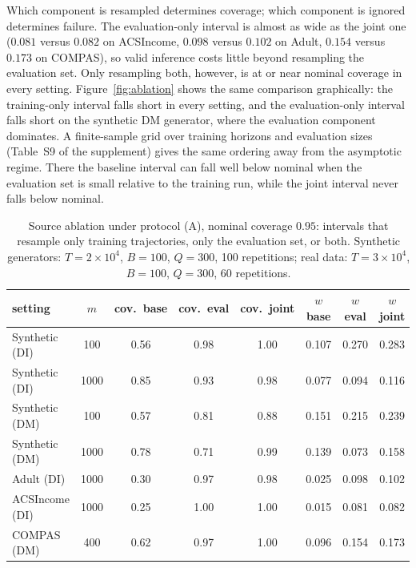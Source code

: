 \documentclass[pdflatex,sn-basic]{sn-jnl}
\begin{document}
Which component is resampled determines coverage; which component is ignored determines failure.  The
evaluation-only interval is almost as wide as the joint one ($0.081$ versus $0.082$ on ACSIncome,
$0.098$ versus $0.102$ on Adult, $0.154$ versus $0.173$ on COMPAS), so valid inference costs little
beyond resampling the evaluation set.  Only resampling both, however, is at or near nominal coverage in
every setting.  Figure~\ref{fig:ablation} shows the same comparison graphically: the training-only interval falls short in every setting, and the evaluation-only interval falls short on the synthetic DM generator, where the evaluation component dominates.  A finite-sample grid over training
horizons and evaluation sizes (Table~S9 of the supplement) gives the same ordering away from the
asymptotic regime.  There the baseline interval can fall well below nominal when the evaluation set is
small relative to the training run, while the joint interval never falls below nominal.

\begin{table}[t]
\centering
\small
\setlength{\tabcolsep}{3pt}
\caption{Source ablation under protocol (A), nominal coverage $0.95$: intervals that resample only
training trajectories, only the evaluation set, or both.  Synthetic generators: $T=2\times10^4$, $B=100$, $Q=300$, 100 repetitions; real data: $T=3\times10^4$, $B=100$, $Q=300$, 60 repetitions.}
\label{tab:ablation}
\begin{tabular}{lccccccc}
\toprule
setting & $m$ & cov.\ base & cov.\ eval & cov.\ joint & $w$ base & $w$ eval & $w$ joint \\
\midrule
Synthetic (DI) & 100  & 0.56 & 0.98 & 1.00 & 0.107 & 0.270 & 0.283 \\
Synthetic (DI) & 1000 & 0.85 & 0.93 & 0.98 & 0.077 & 0.094 & 0.116 \\
Synthetic (DM) & 100  & 0.57 & 0.81 & 0.88 & 0.151 & 0.215 & 0.239 \\
Synthetic (DM) & 1000 & 0.78 & 0.71 & 0.99 & 0.139 & 0.073 & 0.158 \\
Adult (DI)     & 1000 & 0.30 & 0.97 & 0.98 & 0.025 & 0.098 & 0.102 \\
ACSIncome (DI) & 1000 & 0.25 & 1.00 & 1.00 & 0.015 & 0.081 & 0.082 \\
COMPAS (DM)    & 400  & 0.62 & 0.97 & 1.00 & 0.096 & 0.154 & 0.173 \\
\bottomrule
\end{tabular}
\end{table}
\end{document}
